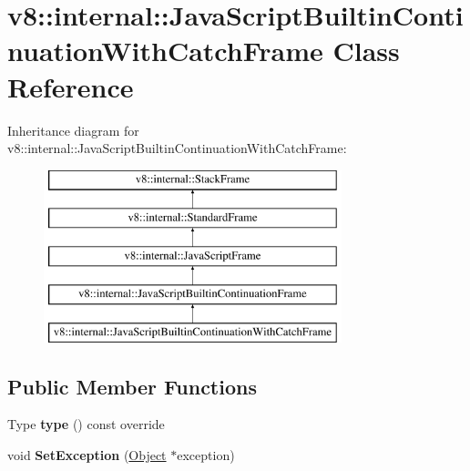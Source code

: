 \hypertarget{classv8_1_1internal_1_1JavaScriptBuiltinContinuationWithCatchFrame}{}\section{v8\+:\+:internal\+:\+:Java\+Script\+Builtin\+Continuation\+With\+Catch\+Frame Class Reference}
\label{classv8_1_1internal_1_1JavaScriptBuiltinContinuationWithCatchFrame}
Inheritance diagram for v8\+:\+:internal\+:\+:Java\+Script\+Builtin\+Continuation\+With\+Catch\+Frame\+:\begin{figure}[H]
\begin{center}
\leavevmode
\includegraphics[height=5.000000cm]{classv8_1_1internal_1_1JavaScriptBuiltinContinuationWithCatchFrame}
\end{center}
\end{figure}
\subsection*{Public Member Functions}
\begin{DoxyCompactItemize}
\item 
\mbox{\label{classv8_1_1internal_1_1JavaScriptBuiltinContinuationWithCatchFrame_acaaca722c355efebd73238be6548d9f7}} 
Type {\bfseries type} () const override
\item 
\mbox{\label{classv8_1_1internal_1_1JavaScriptBuiltinContinuationWithCatchFrame_a379d0348292bbfd7d7a006785aba1e08}} 
void {\bfseries Set\+Exception} (\mbox{\hyperlink{classv8_1_1internal_1_1Object}{Object}} $\ast$exception)
\end{DoxyCompactItemize}

